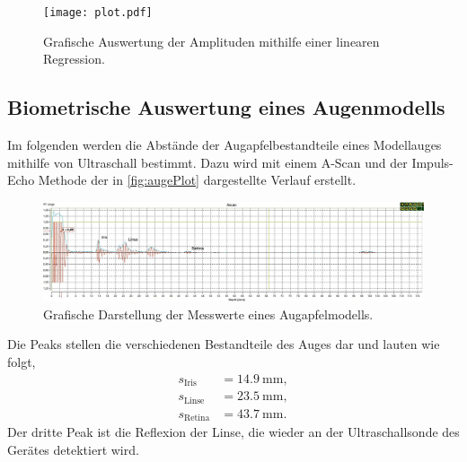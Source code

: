 \begin{figure}[H]
  \centering
  \texttt{[image: plot.pdf]}
  \caption{Grafische Auswertung der Amplituden mithilfe einer linearen Regression.}
  \label{fig:plot}
\end{figure}

\subsection{Biometrische Auswertung eines Augenmodells}
\label{subsec:auge}

Im folgenden werden die Abstände der Augapfelbestandteile eines Modellauges mithilfe von Ultraschall bestimmt. 
Dazu wird mit einem A-Scan und der Impuls-Echo Methode der in \autoref{fig:augePlot} dargestellte Verlauf erstellt.

\begin{figure}[H]
  \centering
  \includegraphics[width = \textwidth]{data/Auge.png}
  \caption{Grafische Darstellung der Messwerte eines Augapfelmodells.}
  \label{fig:augePlot}
\end{figure}

Die Peaks stellen die verschiedenen Bestandteile des Auges dar und lauten wie folgt,
\begin{align*}
  s_{\text{Iris}} &= \SI{14,9}{\mm}, \\
  s_{\text{Linse}} &= \SI{23,5}{\mm}, \\
  s_{\text{Retina}} &= \SI{43,7}{\mm}.
\end{align*}
Der dritte Peak ist die Reflexion der Linse, die wieder an der Ultraschallsonde des Gerätes detektiert wird.